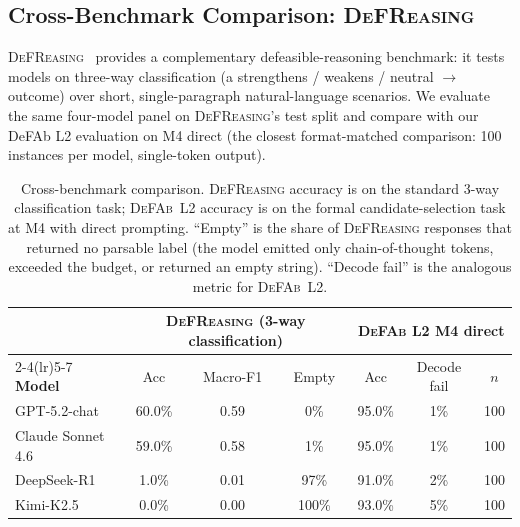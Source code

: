 \documentclass{article}
\theoremstyle{definition}
\begin{document}
\subsection{Cross-Benchmark Comparison: \textsc{DeFReasing}}\label{subsec:defreasing}

\textsc{DeFReasing}~\cite{allaway2025defreasing} provides a complementary defeasible-reasoning benchmark: it tests models on three-way classification (a strengthens / weakens / neutral $\to$ outcome) over short, single-paragraph natural-language scenarios. We evaluate the same four-model panel on \textsc{DeFReasing}'s test split and compare with our DeFAb L2 evaluation on M4 direct (the closest format-matched comparison: 100 instances per model, single-token output).

\begin{table}[h]
\centering
\caption{Cross-benchmark comparison. \textsc{DeFReasing} accuracy is on the standard 3-way classification task; \textsc{DeFAb}~L2 accuracy is on the formal candidate-selection task at M4 with direct prompting. ``Empty'' is the share of \textsc{DeFReasing} responses that returned no parsable label (the model emitted only chain-of-thought tokens, exceeded the budget, or returned an empty string). ``Decode fail'' is the analogous metric for \textsc{DeFAb}~L2.}
\label{tab:defreasing}
\small
\begin{tabular}{@{}lcccccc@{}}
\toprule
& \multicolumn{3}{c}{\textbf{\textsc{DeFReasing} (3-way classification)}} & \multicolumn{3}{c}{\textbf{\textsc{DeFAb} L2 M4 direct}} \\
\cmidrule(lr){2-4}\cmidrule(lr){5-7}
\textbf{Model} & Acc & Macro-F1 & Empty & Acc & Decode fail & $n$ \\
\midrule
GPT-5.2-chat       & 60.0\% & 0.59 & \phantom{0}0\% & 95.0\% & \phantom{0}1\% & 100 \\
Claude Sonnet 4.6  & 59.0\% & 0.58 & \phantom{0}1\% & 95.0\% & \phantom{0}1\% & 100 \\
DeepSeek-R1        & \phantom{0}1.0\% & 0.01 & 97\% & 91.0\% & \phantom{0}2\% & 100 \\
Kimi-K2.5          & \phantom{0}0.0\% & 0.00 & 100\% & 93.0\% & \phantom{0}5\% & 100 \\
\bottomrule
\end{tabular}
\end{table}
\end{document}
